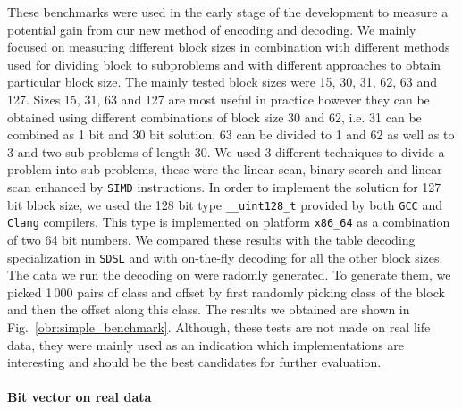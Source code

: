 These benchmarks were used in the early stage of the development to measure a potential gain from
our new method of encoding and decoding. We mainly focused on measuring different block sizes
in combination with different methods used for dividing block to subproblems and with different
approaches to obtain particular block size. The mainly tested block sizes were 15, 30, 31, 62, 63
and 127. Sizes 15, 31, 63 and 127 are most useful in practice however they can be obtained using
different combinations of block size 30 and 62, i.e. 31 can be combined as 1 bit and 30 bit solution,
63 can be divided to 1 and 62 as well as to 3 and two sub-problems of length 30.
We used 3 different techniques to divide a problem into sub-problems, these were the linear scan,
binary search and linear scan enhanced by \texttt{SIMD} instructions. In order to implement the
solution for 127 bit block size, we used the 128 bit type \texttt{\_\_uint128\_t} provided by both
\texttt{GCC} and \texttt{Clang} compilers. This type is implemented on platform \texttt{x86\_64}
as a combination of two 64 bit numbers. We compared these results with the table decoding specialization
in \texttt{SDSL} and with on-the-fly decoding for all the other block sizes. The data we run the decoding
on were radomly generated. To generate them, we picked 1\,000 pairs of class and offset by first randomly
picking class of the block and then the offset along this class. The results we obtained are shown in
Fig.~\ref{obr:simple_benchmark}. Although, these tests are not made on real life data, they were mainly
used as an indication which implementations are interesting and should be the best candidates for further
evaluation.

\paragraph{Bit vector on real data}

